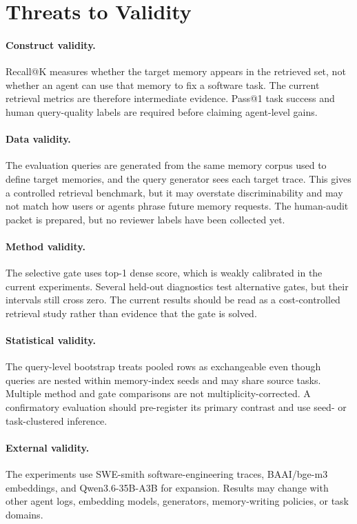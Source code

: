 \documentclass[10pt,twocolumn]{article}
\begin{document}
\section{Threats to Validity}
\paragraph{Construct validity.}
Recall@K measures whether the target memory appears in the retrieved set, not
whether an agent can use that memory to fix a software task. The current
retrieval metrics are therefore intermediate evidence. Pass@1 task success and
human query-quality labels are required before claiming agent-level gains.

\paragraph{Data validity.}
The evaluation queries are generated from the same memory corpus used to define
target memories, and the query generator sees each target trace. This gives a
controlled retrieval benchmark, but it may overstate discriminability and may not
match how users or agents phrase future memory requests. The human-audit packet
is prepared, but no reviewer labels have been collected yet.

\paragraph{Method validity.}
The selective gate uses top-1 dense score, which is weakly calibrated in the
current experiments. Several held-out diagnostics test alternative gates, but
their intervals still cross zero. The current results should be read as a
cost-controlled retrieval study rather than evidence that the gate is solved.

\paragraph{Statistical validity.}
The query-level bootstrap treats pooled rows as exchangeable even though queries
are nested within memory-index seeds and may share source tasks. Multiple method
and gate comparisons are not multiplicity-corrected. A confirmatory evaluation
should pre-register its primary contrast and use seed- or task-clustered inference.

\paragraph{External validity.}
The experiments use SWE-smith software-engineering traces, BAAI/bge-m3
embeddings, and Qwen3.6-35B-A3B for expansion. Results may change with other
agent logs, embedding models, generators, memory-writing policies, or task
domains.
\end{document}
